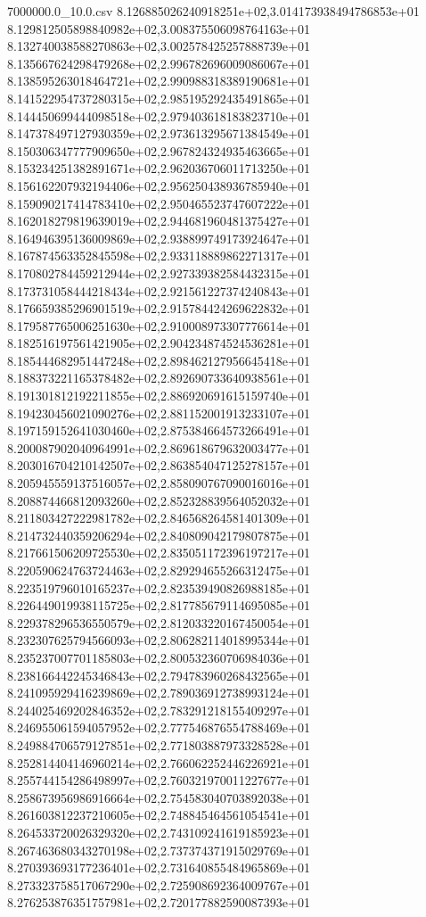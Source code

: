 \begin{filecontents*}{7000000.0_10.0.csv}
8.126885026240918251e+02,3.014173938494786853e+01
8.129812505898840982e+02,3.008375506098764163e+01
8.132740038588270863e+02,3.002578425257888739e+01
8.135667624298479268e+02,2.996782696009086067e+01
8.138595263018464721e+02,2.990988318389190681e+01
8.141522954737280315e+02,2.985195292435491865e+01
8.144450699444098518e+02,2.979403618183823710e+01
8.147378497127930359e+02,2.973613295671384549e+01
8.150306347777909650e+02,2.967824324935463665e+01
8.153234251382891671e+02,2.962036706011713250e+01
8.156162207932194406e+02,2.956250438936785940e+01
8.159090217414783410e+02,2.950465523747607222e+01
8.162018279819639019e+02,2.944681960481375427e+01
8.164946395136009869e+02,2.938899749173924647e+01
8.167874563352845598e+02,2.933118889862271317e+01
8.170802784459212944e+02,2.927339382584432315e+01
8.173731058444218434e+02,2.921561227374240843e+01
8.176659385296901519e+02,2.915784424269622832e+01
8.179587765006251630e+02,2.910008973307776614e+01
8.182516197561421905e+02,2.904234874524536281e+01
8.185444682951447248e+02,2.898462127956645418e+01
8.188373221165378482e+02,2.892690733640938561e+01
8.191301812192211855e+02,2.886920691615159740e+01
8.194230456021090276e+02,2.881152001913233107e+01
8.197159152641030460e+02,2.875384664573266491e+01
8.200087902040964991e+02,2.869618679632003477e+01
8.203016704210142507e+02,2.863854047125278157e+01
8.205945559137516057e+02,2.858090767090016016e+01
8.208874466812093260e+02,2.852328839564052032e+01
8.211803427222981782e+02,2.846568264581401309e+01
8.214732440359206294e+02,2.840809042179807875e+01
8.217661506209725530e+02,2.835051172396197217e+01
8.220590624763724463e+02,2.829294655266312475e+01
8.223519796010165237e+02,2.823539490826988185e+01
8.226449019938115725e+02,2.817785679114695085e+01
8.229378296536550579e+02,2.812033220167450054e+01
8.232307625794566093e+02,2.806282114018995344e+01
8.235237007701185803e+02,2.800532360706984036e+01
8.238166442245346843e+02,2.794783960268432565e+01
8.241095929416239869e+02,2.789036912738993124e+01
8.244025469202846352e+02,2.783291218155409297e+01
8.246955061594057952e+02,2.777546876554788469e+01
8.249884706579127851e+02,2.771803887973328528e+01
8.252814404146960214e+02,2.766062252446226921e+01
8.255744154286498997e+02,2.760321970011227677e+01
8.258673956986916664e+02,2.754583040703892038e+01
8.261603812237210605e+02,2.748845464561054541e+01
8.264533720026329320e+02,2.743109241619185923e+01
8.267463680343270198e+02,2.737374371915029769e+01
8.270393693177236401e+02,2.731640855484965869e+01
8.273323758517067290e+02,2.725908692364009767e+01
8.276253876351757981e+02,2.720177882590087393e+01

\end{filecontents*}
